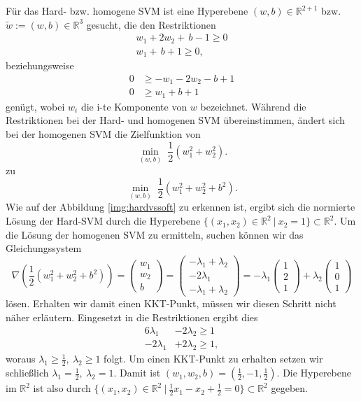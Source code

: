 \begin{beispiel}
Für das Hard- bzw. homogene SVM ist eine Hyperebene $(w,b) \in \mathbb{R}^{2+1}$ bzw. $\tilde{w} := (w,b) \in \mathbb{R}^{3}$ gesucht, die den Restriktionen
$$
\begin{aligned}
	w_1 + 2w_2 + \, b -1 \geq 0 \\
	w_1 + \, b +1 \geq 0,
\end{aligned}
$$
beziehungsweise 
$$
\begin{aligned}
	0 &\geq -w_1 - 2w_2 - b + 1 \\
	0 &\geq  w_1 + b + 1
\end{aligned}
$$
genügt, wobei $w_i$ die i-te Komponente von $w$ bezeichnet. Während die Restriktionen bei der Hard- und homogenen SVM übereinstimmen, ändert sich bei der homogenen SVM die Zielfunktion von
$$
	\min_{(w,b)} \; \frac{1}{2} (w_1^2+w_2^2).
$$
zu
$$
	\min_{(w,b)} \; \frac{1}{2} (w_1^2+w_2^2+b^2).
$$
Wie auf der Abbildung \ref{img:hardvssoft} zu erkennen ist, ergibt sich die normierte Lösung der Hard-SVM durch die Hyperebene $\{ (x_1,x_2) \in \mathbb{R}^2 \ | \ x_2=1 \} \subset \mathbb{R}^2$. 
Um die Lösung der homogenen SVM zu ermitteln, suchen können wir das Gleichungssystem
$$
	\nabla \left( \frac{1}{2}(w_1^2+w_2^2+b^2) \right) = 
	\begin{pmatrix} w_1 \\ w_2 \\ b \end{pmatrix} = 
	\begin{pmatrix} 
		-\lambda_1 + \lambda_2 \\ -2 \lambda_1 \\ -\lambda_1 + \lambda_2 
	\end{pmatrix} = 
	- \lambda_1 \begin{pmatrix} 1 \\ 2 \\ 1 \end{pmatrix} +
	\lambda_2 \begin{pmatrix} 1 \\ 0 \\ 1 \end{pmatrix}
$$
lösen. Erhalten wir damit einen KKT-Punkt, müssen wir diesen Schritt nicht näher erläutern. Eingesetzt in die Restriktionen ergibt dies
$$
\begin{aligned}
	6 \lambda_1 & - 2 \lambda_2 \geq 1 \\
	-2 \lambda_1 &+ 2 \lambda_2 \geq 1,
\end{aligned}
$$
woraus $\lambda_1 \geq \frac{1}{2} ,\ \lambda_2 \geq 1$ folgt. Um einen KKT-Punkt zu erhalten setzen wir schließlich $\lambda_1 = \frac{1}{2} ,\ \lambda_2=1$. Damit ist $(w_1, w_2, b) = (\tfrac{1}{2}, -1, \tfrac{1}{2})$. Die Hyperebene im $\mathbb{R}^2$ ist also durch $ \{ (x_1,x_2) \in \mathbb{R}^2 \ | \ \tfrac{1}{2}x_1-x_2+\tfrac{1}{2} = 0  \} \subset \mathbb{R}^2$ gegeben.
\end{beispiel}


